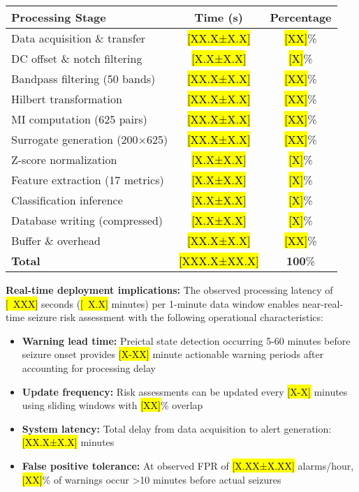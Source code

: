 \begin{table}[h]
\centering
\begin{tabular}{lcc}
\hline
\textbf{Processing Stage} & \textbf{Time (s)} & \textbf{Percentage} \\
\hline
Data acquisition \& transfer & \hl{[XX.X±X.X]} & \hl{[XX]}\% \\
DC offset \& notch filtering & \hl{[X.X±X.X]} & \hl{[X]}\% \\
Bandpass filtering (50 bands) & \hl{[XX.X±X.X]} & \hl{[XX]}\% \\
Hilbert transformation & \hl{[XX.X±X.X]} & \hl{[XX]}\% \\
MI computation (625 pairs) & \hl{[XX.X±X.X]} & \hl{[XX]}\% \\
Surrogate generation (200×625) & \hl{[XX.X±X.X]} & \hl{[XX]}\% \\
Z-score normalization & \hl{[X.X±X.X]} & \hl{[X]}\% \\
Feature extraction (17 metrics) & \hl{[X.X±X.X]} & \hl{[X]}\% \\
Classification inference & \hl{[X.X±X.X]} & \hl{[X]}\% \\
Database writing (compressed) & \hl{[X.X±X.X]} & \hl{[X]}\% \\
Buffer \& overhead & \hl{[XX.X±X.X]} & \hl{[XX]}\% \\
\hline
\textbf{Total} & \hl{[XXX.X±XX.X]} & \textbf{100}\% \\
\hline
\end{tabular}
\end{table}

\textbf{Real-time deployment implications:} The observed processing latency of \hl{[~XXX]} seconds (\hl{[~X.X]} minutes) per 1-minute data window enables near-real-time seizure risk assessment with the following operational characteristics:
\begin{itemize}
\item \textbf{Warning lead time:} Preictal state detection occurring 5-60 minutes before seizure onset provides \hl{[X-XX]} minute actionable warning periods after accounting for processing delay
\item \textbf{Update frequency:} Risk assessments can be updated every \hl{[X-X]} minutes using sliding windows with \hl{[XX]}\% overlap
\item \textbf{System latency:} Total delay from data acquisition to alert generation: \hl{[XX.X±X.X]} minutes
\item \textbf{False positive tolerance:} At observed FPR of \hl{[X.XX±X.XX]} alarms/hour, \hl{[XX]}\% of warnings occur >10 minutes before actual seizures
\end{itemize}

